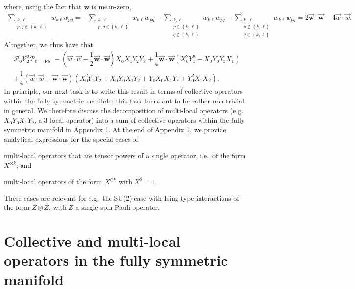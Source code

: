 \documentclass[nofootinbib,notitlepage,11pt]{revtex4-2}
\newcommand{\f}[2]{\dfrac{#1}{#2}} %
\newcommand{\p}[1]{\left(#1\right)} %
\renewcommand{\set}[1]{\left\{#1\right\}} %
\renewcommand{\c}{\cdot} %
\newcommand{\m}{\bm} %
\renewcommand{\v}{\vec} %
\newcommand{\1}{\mathds{1}}
\renewcommand{\P}{\mathcal{P}}
\newcommand{\V}{\mathcal{V}}
\newcommand{\EQFS}{=_{\text{FS}}}
\begin{document}
where, using the fact that $\m w$ is mean-zero,
\begin{align}
  \sum_{\substack{k,\ell\\p,q\notin\set{k,\ell}}} w_{k\ell} w_{pq}
  = - \sum_{\substack{k,\ell\\p,q\in\set{k,\ell}}} w_{k\ell} w_{pq}
  - \sum_{\substack{k,\ell\\p\in\set{k,\ell}\\q\notin\set{k,\ell}}}
  w_{k\ell} w_{pq}
  - \sum_{\substack{k,\ell\\p\notin\set{k,\ell}\\q\in\set{k,\ell}}}
  w_{k\ell} w_{pq}
  = 2 \v{\m w}\c\v{\m w} - 4 \v w\c\v w.
\end{align}
Altogether, we thus have that
\begin{multline}
  \P_0 \V_2^2 \P_0
  \EQFS -\p{\v w\c\v w - \f12 \v{\m w}\c\v{\m w}} X_0 X_1 Y_2 Y_3
  + \f14 \v{\m w}\c\v{\m w} \p{X_0^2 Y_1^2 + X_0 Y_0 Y_1 X_1} \\
  + \f14 \p{\v w\c\v w - \v{\m w}\c\v{\m w}}
  \p{X_0^2 Y_1 Y_2 + X_0 Y_0 X_1 Y_2
    + Y_0 X_0 X_1 Y_2 + Y_0^2 X_1 X_2}.
  \label{eq:PXYXYP}
\end{multline}
In principle, our next task is to write this result in terms of
collective operators within the fully symmetric manifold; this task
turns out to be rather non-trivial in general.  We therefore discuss
the decomposition of multi-local operators (e.g.~$X_0Y_0X_1Y_2$, a
3-local operator) into a sum of collective operators within the fully
symmetric manifold in Appendix \ref{sec:multi_to_collective}.  At the
end of Appendix \ref{sec:multi_to_collective}, we provide analytical
expressions for the special cases of
\begin{enumerate*}
\item multi-local operators that are tensor powers of a single
  operator, i.e.~of the form $X^{\otimes k}$; and
\item multi-local operators of the form $X^{\otimes k}$ with $X^2=1$.
\end{enumerate*}
These cases are relevant for e.g.~the SU(2) case with Ising-type
interactions of the form $Z\otimes Z$, with $Z$ a single-spin Pauli
operator.

\section{Collective and multi-local operators in the fully symmetric
  manifold}
\label{sec:multi_to_collective}
\end{document}
